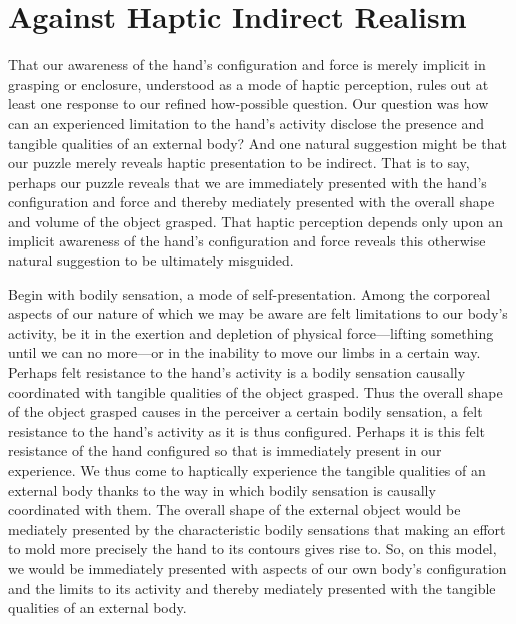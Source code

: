 
\section{Against Haptic Indirect Realism} %
\label{sec:against_haptic_indirect_realism}

That our awareness of the hand's configuration and force is merely implicit in grasping or enclosure, understood as a mode of haptic perception, rules out at least one response to our refined how-possible question. Our question was how can an experienced limitation to the hand's activity disclose the presence and tangible qualities of an external body? And one natural suggestion might be that our puzzle merely reveals haptic presentation to be indirect. That is to say, perhaps our puzzle reveals that we are immediately presented with the hand's configuration and force and thereby mediately presented with the overall shape and volume of the object grasped. That haptic perception depends only upon an implicit awareness of the hand's configuration and force reveals this otherwise natural suggestion to be ultimately misguided.

Begin with bodily sensation, a mode of self-presentation. Among the corporeal aspects of our nature of which we may be aware are felt limitations to our body's activity, be it in the exertion and depletion of physical force---lifting something until we can no more---or in the inability to move our limbs in a certain way. Perhaps felt resistance to the hand's activity is a bodily sensation causally coordinated with tangible qualities of the object grasped. Thus the overall shape of the object grasped causes in the perceiver a certain bodily sensation, a felt resistance to the hand's activity as it is thus configured. Perhaps it is this felt resistance of the hand configured so that is immediately present in our experience. We thus come to haptically experience the tangible qualities of an external body thanks to the way in which bodily sensation is causally coordinated with them. The overall shape of the external object would be mediately presented by the characteristic bodily sensations that making an effort to mold more precisely the hand to its contours gives rise to. So, on this model, we would be immediately presented with aspects of our own body's configuration and the limits to its activity and thereby mediately presented with the tangible qualities of an external body.

